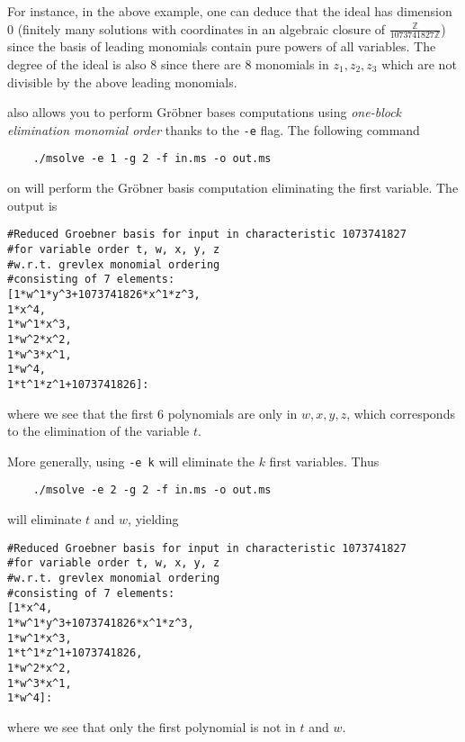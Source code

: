 \documentclass[a4paper,english,11pt]{scrartcl}
\theoremstyle{definition}
\theoremstyle{remark}
\begin{document}
For instance, in the above example, one can deduce that the ideal has dimension
$0$ (finitely many solutions with coordinates in an algebraic closure of
$\frac{\mathbb{Z}}{1073741827\mathbb{Z}}$) since the basis of leading monomials
contain pure powers of all variables. The degree of the ideal is also $8$ since
there are $8$ monomials in $z_1, z_2, z_3$ which are not divisible by the above
leading monomials.

\msolve also allows you to perform Gröbner bases computations using 
\emph{one-block elimination monomial order}
thanks to the \verb+-e+ flag. The following command 
\begin{tcolorbox}
  \begin{verbatim}
    ./msolve -e 1 -g 2 -f in.ms -o out.ms
  \end{verbatim}
\end{tcolorbox}
on
will perform the Gröbner basis computation eliminating the first
variable.
The output is
\begin{tcolorbox}
  \begin{lstlisting}
#Reduced Groebner basis for input in characteristic 1073741827
#for variable order t, w, x, y, z
#w.r.t. grevlex monomial ordering
#consisting of 7 elements:
[1*w^1*y^3+1073741826*x^1*z^3,
1*x^4,
1*w^1*x^3,
1*w^2*x^2,
1*w^3*x^1,
1*w^4,
1*t^1*z^1+1073741826]:
  \end{lstlisting}
\end{tcolorbox}
where we see that the first $6$ polynomials are only in $w,x,y,z$,
which corresponds to the elimination of the variable $t$.

More generally, using \verb+-e k+ will eliminate the $k$ first
variables. Thus
\begin{tcolorbox}
  \begin{verbatim}
    ./msolve -e 2 -g 2 -f in.ms -o out.ms
  \end{verbatim}
\end{tcolorbox}
will eliminate $t$ and $w$, yielding
\begin{tcolorbox}
  \begin{lstlisting}
#Reduced Groebner basis for input in characteristic 1073741827
#for variable order t, w, x, y, z
#w.r.t. grevlex monomial ordering
#consisting of 7 elements:
[1*x^4,
1*w^1*y^3+1073741826*x^1*z^3,
1*w^1*x^3,
1*t^1*z^1+1073741826,
1*w^2*x^2,
1*w^3*x^1,
1*w^4]:
  \end{lstlisting}
\end{tcolorbox}
where we see that only the first polynomial is not in $t$ and $w$.
\end{document}
